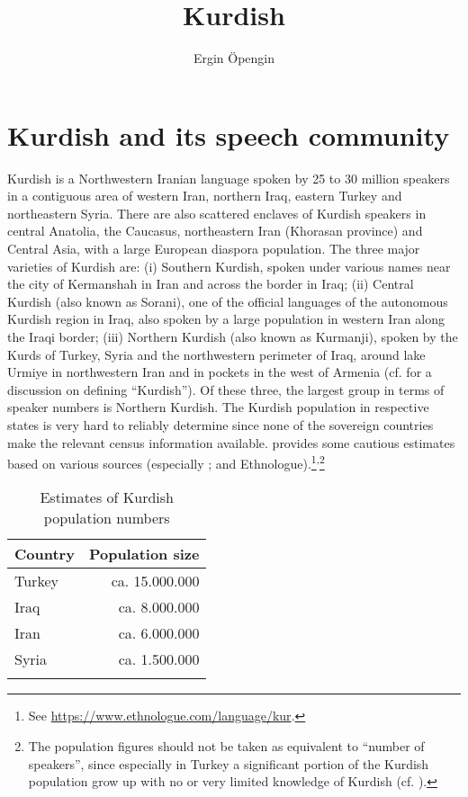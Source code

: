 \documentclass[output=paper]{langsci/langscibook}
\author{Ergin Öpengin\affiliation{Uppsala University}}
\title{Kurdish}
\begin{document}
\maketitle

\section{Kurdish and its speech community} 

Kurdish is a Northwestern Iranian language spoken by 25 to 30 million speakers in a contiguous area of western Iran, northern Iraq, eastern Turkey and northeastern Syria. There are also scattered enclaves of Kurdish speakers in central Anatolia, the Caucasus, northeastern Iran (Khorasan province) and Central Asia, with a large European diaspora population. The three major varieties of Kurdish are: (i) Southern Kurdish, spoken under various names near the city of Kermanshah in Iran and across the border in Iraq; (ii) Central Kurdish (also known as Sorani), one of the official languages of the autonomous Kurdish region in Iraq, also spoken by a large population in western Iran along the Iraqi border; (iii) Northern Kurdish (also known as Kurmanji), spoken by the Kurds of Turkey, Syria and the northwestern perimeter of Iraq, around lake Urmiye in northwestern Iran and in pockets in the west of Armenia (cf. \citealt{HaigÖpengin2014} for a discussion on defining “Kurdish”). Of these three, the largest group in terms of speaker numbers is Northern Kurdish. The Kurdish population in respective states is very hard to reliably determine since none of the sovereign countries make the relevant census information available.  provides some cautious estimates based on various sources (especially \citealt{Sirkeci2005,ZeyneloğluEtAl2016}; and Ethnologue).\footnote{See \url{https://www.ethnologue.com/language/kur}.}\textsuperscript{,}\footnote{The population figures should not be taken as equivalent to “number of speakers”, since especially in Turkey a significant portion of the Kurdish population grow up with no or very limited knowledge of Kurdish (cf. \citealt{Öpengin2012,ZeyneloğluEtAl2016}).} 

\begin{table}
\begin{tabular}{lr}
\lsptoprule
Country & Population size\\\midrule
{Turkey} & ca. 15.000.000\\
{Iraq}   & ca. 8.000.000\\
{Iran}   & ca. 6.000.000\\
{Syria}  & ca. 1.500.000\\
\lspbottomrule
\end{tabular}
\caption{Estimates of Kurdish population numbers}
\label{tab:opengin:1}
\end{table}
\end{document}
